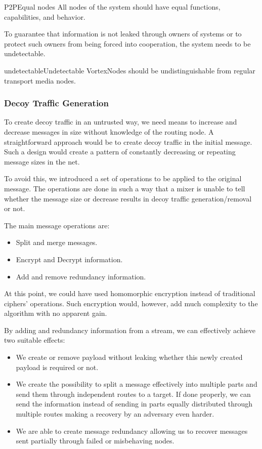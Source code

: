 \begin{requirement}{P2P}{Equal nodes}
	All nodes of the system should have equal functions, capabilities, and behavior.
\end{requirement}

To guarantee that information is not leaked through owners of systems or to protect such owners from being forced into cooperation, the system needs to be undetectable.
\begin{requirement}{undetectable}{Undetectable}
	VortexNodes should be undistinguishable from regular transport media nodes. 
\end{requirement}

\subsubsection{Decoy Traffic Generation}
To create decoy traffic in an untrusted way, we need means to increase and decrease messages in size without knowledge of the routing node. A straightforward approach would be to create decoy traffic in the initial message. Such a design would create a pattern of constantly decreasing or repeating message sizes in the net. 

To avoid this, we introduced a set of operations to be applied to the original message. The operations are done in such a way that a mixer is unable to tell whether the message size or decrease results in decoy traffic generation/removal or not.

The main message operations are:
\begin{itemize}
	\item Split and merge messages.
	\item Encrypt and Decrypt information.
	\item Add and remove redundancy information.
\end{itemize}

At this point, we could have used homomorphic encryption instead of traditional ciphers' operations. Such encryption would, however, add much complexity to the algorithm with no apparent gain.

By adding and redundancy information from a stream, we can effectively achieve two suitable effects:
\begin{itemize}
	\item We create or remove payload without leaking whether this newly created payload is required or not.
	\item We create the possibility to split a message effectively into multiple parts and send them through independent routes to a target. If done properly, we can send the information instead of sending in parts equally distributed through multiple routes making a recovery by an adversary even harder. 
	\item We are able to create message redundancy allowing us to recover messages sent partially through failed or misbehaving nodes.
\end{itemize}

